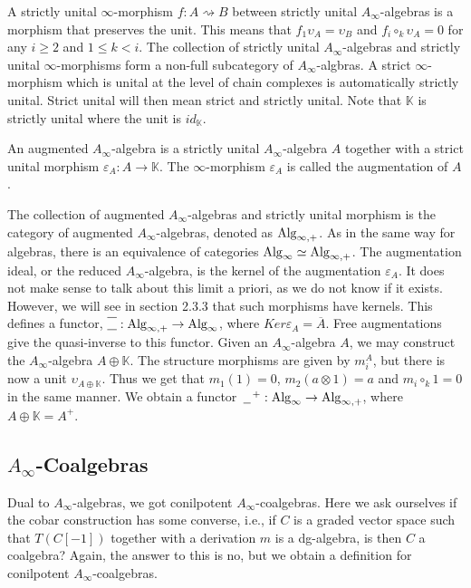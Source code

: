 \documentclass[../thesis.tex]{subfiles}
\begin{document}
        A strictly unital $\infty$-morphism $f: A \rightsquigarrow B$ between strictly unital $A_\infty$-algebras is a morphism that preserves the unit. This means that $f_1\upsilon_A = \upsilon_B$ and $f_i \circ_k \upsilon_A = 0$ for any $i \geq 2$ and $1 \leq k < i$. The collection of strictly unital $A_\infty$-algebras and strictly unital $\infty$-morphisms form a non-full subcategory of $A_\infty$-algbras. A strict $\infty$-morphism which is unital at the level of chain complexes is automatically strictly unital. Strict unital will then mean strict and strictly unital. Note that $\mathbb{K}$ is strictly unital where the unit is $id_\mathbb{K}$.

        \begin{definition}\label{def: augmented-sha}
            An augmented $A_\infty$-algebra is a strictly unital $A_\infty$-algebra $A$ together with a strict unital morphism $\varepsilon_A: A \rightarrow \mathbb{K}$. The $\infty$-morphism $\varepsilon_A$ is called the augmentation of $A$.
        \end{definition}

        The collection of augmented $A_\infty$-algebras and strictly unital morphism is the category of augmented $A_\infty$-algebras, denoted as $\tt{Alg}_{\infty,+}$. As in the same way for algebras, there is an equivalence of categories $\tt{Alg}_\infty \simeq \tt{Alg}_{\infty,+}$. The augmentation ideal, or the reduced $A_\infty$-algebra, is the kernel of the augmentation $\varepsilon_A$. It does not make sense to talk about this limit a priori, as we do not know if it exists. However, we will see in section 2.3.3 that such morphisms have kernels. This defines a functor, $\overline{\underline{\phantom{A}}} : \tt{Alg}_{\infty ,+} \rightarrow \tt{Alg}_\infty$, where $Ker\varepsilon_A = \overline{A}$. Free augmentations give the quasi-inverse to this functor. Given an $A_\infty$-algebra $A$, we may construct the $A_\infty$-algebra $A\oplus \mathbb{K}$. The structure morphisms are given by $m_i^A$, but there is now a unit $\upsilon_{A\oplus\mathbb{K}}$. Thus we get that $m_1(1) = 0$, $m_2 (a\otimes 1) = a$ and $m_i \circ_k 1 = 0$ in the same manner. We obtain a functor $\argument^+ : \tt{Alg}_\infty \rightarrow \tt{Alg}_{\infty, +}$, where $A\oplus \mathbb{K} = A^+$.

    \subsection{$A_\infty$-Coalgebras}    
        Dual to $A_\infty$-algebras, we got conilpotent $A_\infty$-coalgebras. Here we ask ourselves if the cobar construction has some converse, i.e., if $C$ is a graded vector space such that $T(C[-1])$ together with a derivation $m$ is a dg-algebra, is then $C$ a coalgebra? Again, the answer to this is no, but we obtain a definition for conilpotent $A_\infty$-coalgebras.
\end{document}
